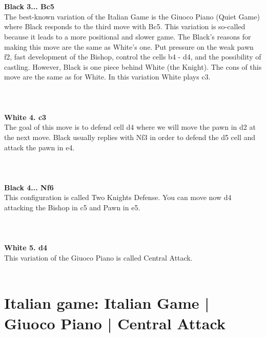 \documentclass{article}
\begin{document}

\\
\\
\textbf{Black 3... Bc5}\\
The best-known variation of the Italian Game is the Giuoco Piano (Quiet Game) where Black responds to the third move with Bc5. This variation is so-called because it leads to a more positional and slower game.
The Black's reasons for making this move are the same as White's one. Put pressure on the weak pawn f2, fast development of the Bishop, control the cells b4 - d4, and the possibility of castling. However, Black is one piece behind White (the Knight).
The cons of this move are the same as for White.
In this variation White plays c3.\\
\\

\\
\\
\textbf{White 4. c3}\\
The goal of this move is to defend cell d4 where we will move the pawn in d2 at the next move.
Black usually replies with Nf3 in order to defend the d5 cell and attack the pawn in e4.\\
\\

\\
\\
\textbf{Black 4... Nf6}\\
This configuration is called Two Knights Defense. You can move now d4 attacking the Bishop in c5 and Pawn in e5.\\
\\

\\
\\
\textbf{White 5. d4}\\
This variation of the Giuoco Piano is called Central Attack.\\
\\
\section{Italian game: Italian Game | Giuoco Piano | Central Attack}
\end{document}
